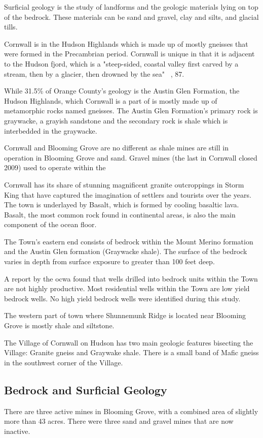 Surficial geology is the study of landforms and the geologic 
materials lying on top of the bedrock. These materials can be sand and gravel, clay and silts, and glacial tills.

Cornwall is in the Hudson Highlands which is made up of mostly gneisses that were formed in the Precambrian period. Cornwall is unique in that it is adjacent to the Hudson fjord, which is a "steep-sided, coastal valley first carved by a stream, then by a glacier, then drowned by the sea" ~\citep{vandiver}, 87.

While 31.5\% of Orange County's geology is the Austin Glen Formation, the Hudson Highlands, which Cornwall is a part of is mostly made up of metamorphic rocks named gneisses. The Austin Glen Formation's primary rock is graywacke, a grayish sandstone and the secondary rock is shale which is interbedded in the graywacke.

Cornwall and Blooming Grove are no 
different as shale mines are still in operation in Blooming Grove and 
sand. Gravel mines (the last in Cornwall closed 2009) used to operate within the 

Cornwall has its share of stunning magnificent granite outcroppings in Storm King that have captured the imagination of settlers and tourists over the years. The town is underlayed by Basalt, which is formed by cooling basaltic lava. Basalt, the most common rock found in continental areas, is also the main component of the ocean floor. 

The Town's eastern end consists of bedrock within the Mount Merino formation and the
Austin Glen formation (Graywacke shale). The surface of the bedrock varies in depth from surface exposure to greater than 100 feet deep.

A report by the \gls{ocwa} found that wells drilled into 
bedrock units within the Town are not highly productive. Most residential wells 
within the Town are low yield bedrock wells. No high yield bedrock wells were 
identified during this study.

The western part of town where Shunnemunk Ridge is located near Blooming Grove 
is mostly shale and siltstone.

The Village of Cornwall on Hudson has two main geologic features bisecting the 
Village: Granite gneiss and Graywake shale. There is a small band of Mafic gneiss in the southwest corner of the Village.

\subsection{Bedrock and Surficial Geology}
There are three active mines in Blooming Grove, with a combined area of slightly more than 43 acres.
There were three sand and gravel mines that are now inactive.

